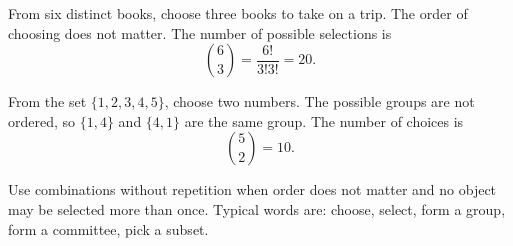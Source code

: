 \begin{examplebox}
From six distinct books, choose three books to take on a trip. The order of choosing does not matter. The number of possible selections is
\[
\binom{6}{3}=\frac{6!}{3!3!}=20.
\]
\end{examplebox}

\begin{examplebox}
From the set \(\{1,2,3,4,5\}\), choose two numbers. The possible groups are not ordered, so \(\{1,4\}\) and \(\{4,1\}\) are the same group. The number of choices is
\[
\binom{5}{2}=10.
\]
\end{examplebox}

\begin{remarkbox}
Use combinations without repetition when order does not matter and no object may be selected more than once. Typical words are: choose, select, form a group, form a committee, pick a subset.
\end{remarkbox}
